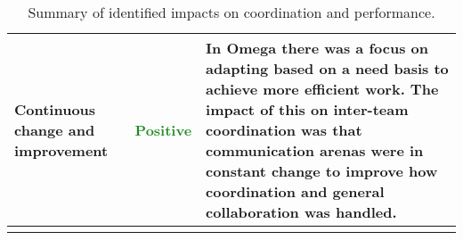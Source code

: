 \begin{center}
\begin{longtable}{| p{4cm} | p{2cm} | p{8.5cm} |}
	Continuous change and improvement & \textcolor{ForestGreen}{Positive} & In Omega there was a focus on adapting based on a need basis to achieve more efficient work. The impact of this on inter-team coordination was that communication arenas were in constant change to improve how coordination and general collaboration was handled. \\ \hline
	\caption{Summary of identified impacts on coordination and performance.}
	\label{conclusion_final}
	\end{longtable}
\end{center}
